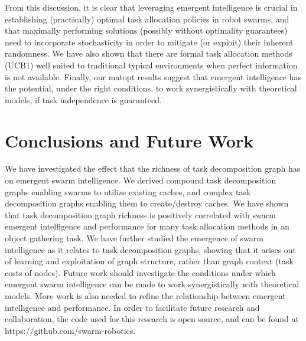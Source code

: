 From this discussion, it is clear that leveraging emergent intelligence is crucial in
establishing (practically) optimal task allocation policies in robot swarms, and that
maximally performing solutions (possibly without optimality guarantees) need to
incorporate stochasticity in order to mitigate (or exploit) their inherent
randomness. We have also shown that there are formal task allocation methods (UCB1)
well suited to traditional typical environments when perfect information is not
available. Finally, our \gls{matopt} results suggest that emergent intelligence has the
potential, under the right conditions, to work synergistically with theoretical
models, if task independence is guaranteed.
%
\section{Conclusions and Future Work}\label{sec:conclusions}
%
We have investigated the effect that the richness of task decomposition graph has on
emergent swarm intelligence. We derived compound task decomposition graphs enabling
swarms to utilize existing caches, and complex task decomposition graphs enabling
them to create/destroy caches. We have shown that task decomposition graph richness
is positively correlated with swarm emergent intelligence and performance for many
task allocation methods in an object gathering task. We have further studied the
emergence of swarm intelligence as it relates to task decomposition graphs, showing
that it arises out of learning and exploitation of graph structure, rather than graph
context (task costs of nodes). Future work should investigate the conditions under
which emergent swarm intelligence can be made to work synergistically with
theoretical models. More work is also needed to refine the relationship between
emergent intelligence and performance. In order to facilitate future research and
collaboration, the code used for this research is open source, and can be found at
https://github.com/swarm-robotics.

